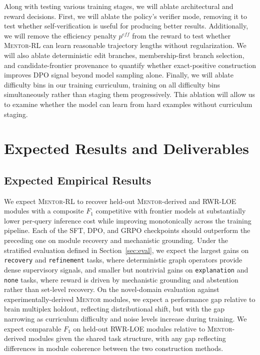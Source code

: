 \documentclass[thesis,letterpaper,12pt]{utthesis}
\begin{document}
Along with testing various training stages, we will ablate architectural and reward decisions. First, we will ablate the policy's verifier mode, removing it to test whether self-verification is useful for producing better results. Additionally, we will remove the efficiency penalty $p^{eff}$ from the reward to test whether \textsc{Mentor-RL} can learn reasonable trajectory lengths without regularization. We will also ablate deterministic edit branches, membership-first branch selection, and candidate-frontier provenance to quantify whether exact-positive construction improves DPO signal beyond model sampling alone. Finally, we will ablate difficulty bins in our training curriculum, training on all difficulty bins simultaneously rather than staging them progressively. This ablation will allow us to examine whether the model can learn from hard examples without curriculum staging.

\section{Expected Results and Deliverables}

\subsection{Expected Empirical Results}
We expect \textsc{Mentor-RL} to recover held-out \textsc{Mentor}-derived and RWR-LOE modules with a composite $F_1$ competitive with frontier models at substantially lower per-query inference cost while improving monotonically across the training pipeline. Each of the SFT, DPO, and GRPO checkpoints should outperform the preceding one on module recovery and mechanistic grounding. Under the stratified evaluation defined in Section~\ref{sec:eval}, we expect the largest gains on \texttt{recovery} and \texttt{refinement} tasks, where deterministic graph operators provide dense supervisory signals, and smaller but nontrivial gains on \texttt{explanation} and \texttt{none} tasks, where reward is driven by mechanistic grounding and abstention rather than set-level recovery. On the novel-domain evaluation against experimentally-derived \textsc{Mentor} modules, we expect a performance gap relative to brain multiplex holdout, reflecting distributional shift, but with the gap narrowing as curriculum difficulty and noise levels increase during training. We expect comparable $F_1$ on held-out RWR-LOE modules relative to \textsc{Mentor}-derived modules given the shared task structure, with any gap reflecting differences in module coherence between the two construction methods.
\end{document}
